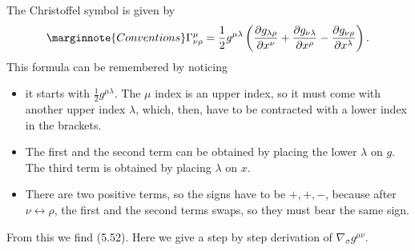 \documentclass[hyperref, a4paper]{article}
\begin{document}
The Christoffel symbol is given by 
\begin{equation} \marginnote{Conventions}
    \Gamma_{\nu \rho}^{\mu}=\frac{1}{2} g^{\mu \lambda}\left(\frac{\partial g_{\lambda \rho}}{\partial x^{\nu}}+\frac{\partial g_{\nu \lambda}}{\partial x^{\rho}}-\frac{\partial g_{\nu \rho}}{\partial x^{\lambda}}\right).
\end{equation}
This formula can be remembered by noticing  
\begin{itemize}
    \item it starts with $\frac{1}{2} g^{\mu \lambda}$. The $\mu$ index is an upper index, so it must come with 
    another upper index $\lambda$, which, then, have to be contracted with a lower index in the brackets.
    \item The first and the second term can be obtained by placing the lower $\lambda$ on $g$. The third term 
    is obtained by placing $\lambda$ on $x$.
    \item There are two positive terms, so the signs have to be $+, +, -$, because after $\nu \leftrightarrow \rho$,
    the first and the second terms swaps, so they must bear the same sign.
\end{itemize}
From this we find (5.52).  Here we give a step by step derivation of $\nabla_\sigma g^{\mu \nu}$.
\end{document}
